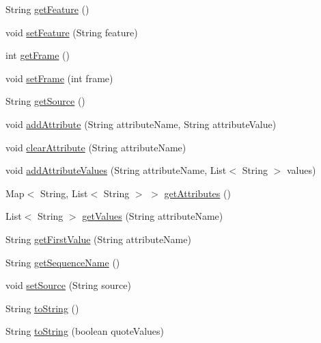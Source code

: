 \begin{DoxyCompactItemize}
\item 
String \hyperlink{classbroad_1_1core_1_1annotation_1_1_g_f_f_a32286be94741ff45ae9d4ec4caa7f742}{get\+Feature} ()
\item 
void \hyperlink{classbroad_1_1core_1_1annotation_1_1_g_f_f_af47cdf69076679c5c3ef472a2f233f7f}{set\+Feature} (String feature)
\item 
int \hyperlink{classbroad_1_1core_1_1annotation_1_1_g_f_f_a448010b0f277781ba06a15c3b371bed5}{get\+Frame} ()
\item 
void \hyperlink{classbroad_1_1core_1_1annotation_1_1_g_f_f_a8ce81e663aa0881438758e50d4bdfc79}{set\+Frame} (int frame)
\item 
String \hyperlink{classbroad_1_1core_1_1annotation_1_1_g_f_f_aa65cbde0f9e887df1a5e19199693c531}{get\+Source} ()
\item 
void \hyperlink{classbroad_1_1core_1_1annotation_1_1_g_f_f_a5073512ebf4bc0d66b492dcd5c331307}{add\+Attribute} (String attribute\+Name, String attribute\+Value)
\item 
void \hyperlink{classbroad_1_1core_1_1annotation_1_1_g_f_f_a065fabc714731218d195f1e65031dab2}{clear\+Attribute} (String attribute\+Name)
\item 
void \hyperlink{classbroad_1_1core_1_1annotation_1_1_g_f_f_a37d42e4dd7a5e0c82fd28b901bd98dc5}{add\+Attribute\+Values} (String attribute\+Name, List$<$ String $>$ values)
\item 
Map$<$ String, List$<$ String $>$ $>$ \hyperlink{classbroad_1_1core_1_1annotation_1_1_g_f_f_a5e628e04590803dd8cfdbf6df7a3875c}{get\+Attributes} ()
\item 
List$<$ String $>$ \hyperlink{classbroad_1_1core_1_1annotation_1_1_g_f_f_a7c572e27e1de2c50c6dfefca340c39ea}{get\+Values} (String attribute\+Name)
\item 
String \hyperlink{classbroad_1_1core_1_1annotation_1_1_g_f_f_a4bbeab1dc47ec4c302cfc3aca1fe9c53}{get\+First\+Value} (String attribute\+Name)
\item 
String \hyperlink{classbroad_1_1core_1_1annotation_1_1_g_f_f_a13830d58f52bb6a17c2232b737ea0baf}{get\+Sequence\+Name} ()
\item 
void \hyperlink{classbroad_1_1core_1_1annotation_1_1_g_f_f_add3d2dedb1d2dd60bc151c7a8ae3dd99}{set\+Source} (String source)
\item 
String \hyperlink{classbroad_1_1core_1_1annotation_1_1_g_f_f_ad10fdff8df413041eec010af5ef03d22}{to\+String} ()
\item 
String \hyperlink{classbroad_1_1core_1_1annotation_1_1_g_f_f_aebce8e9fa994c268959c02476d8cea80}{to\+String} (boolean quote\+Values)

\end{DoxyCompactItemize}
